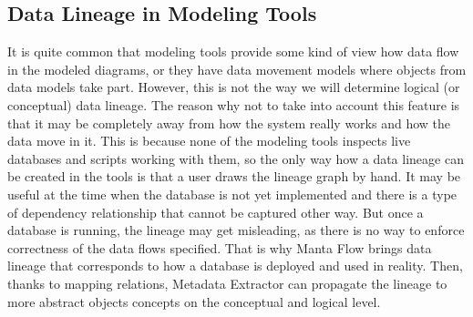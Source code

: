 \subsection{Data Lineage in Modeling Tools}

It is quite common that modeling tools provide some kind of view how data flow in the modeled diagrams, or they have data movement models where objects from data models take part. 
However, this is not the way we will determine logical (or conceptual) data lineage.
The reason why not to take into account this feature is that it may be completely away from how the system really works and how the data move in it. 
This is because none of the modeling tools inspects live databases and scripts working with them, so the only way how a data lineage can be created in the tools is that a user draws the lineage graph by hand. 
It may be useful at the time when the database is not yet implemented and there is a type of dependency relationship that cannot be captured other way. But once a database is running, the lineage may get misleading, as there is no way to enforce correctness of the data flows specified.
That is why Manta Flow brings data lineage that corresponds to how a database is deployed and used in reality. Then, thanks to mapping relations, Metadata Extractor can propagate the lineage to more abstract objects concepts on the conceptual and logical level.
